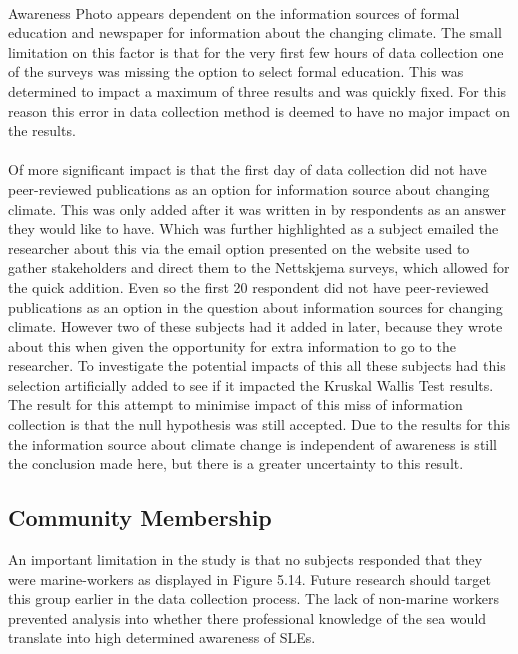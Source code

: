 \paragraph{}
Awareness Photo appears dependent on the information sources of formal education and newspaper for information about the changing climate. The small limitation on this factor is that for the very first few hours of data collection one of the surveys was missing the option to select formal education. This was determined to impact a maximum of three results and was quickly fixed. For this reason this error in data collection method is deemed to have no major impact on the results. 
\paragraph{}
Of more significant impact is that the first day of data collection did not have peer-reviewed publications as an option for information source about changing climate. This was only added after it was written in by respondents as an answer they would like to have. Which was further highlighted as a subject emailed the researcher about this via the email option presented on the website used to gather stakeholders and direct them to the Nettskjema surveys, which allowed for the quick addition. Even so the first 20 respondent did not have peer-reviewed publications as an option in the question about information sources for changing climate. However two of these subjects had it added in later, because they wrote about this when given the opportunity for extra information to go to the researcher. To investigate the potential impacts of this all these subjects had this selection artificially added to see if it impacted the Kruskal Wallis Test results. The result for this attempt to minimise impact of this miss of information collection is that the null hypothesis was still accepted. Due to the results for this the information source about climate change is independent of awareness is still the conclusion made here, but there is a greater uncertainty to this result.
\paragraph{}


\subsection{Community Membership}
An important limitation in the study is that no subjects responded that they were marine-workers as displayed in Figure 5.14. Future research should target this group earlier in the data collection process. The lack of non-marine workers prevented analysis into whether there professional knowledge of the sea would translate into high determined awareness of SLEs.
